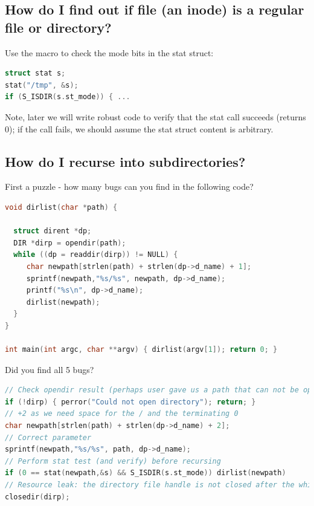 \subsection{How do I find out if file (an inode) is a regular file or directory?}\label{how-do-i-find-out-if-file-an-inode-is-a-regular-file-or-directory}

Use the  macro to check the mode bits in the stat struct:

\begin{lstlisting}[language=C]
struct stat s;
stat("/tmp", &s);
if (S_ISDIR(s.st_mode)) { ... 
\end{lstlisting}

Note, later we will write robust code to verify that the stat call succeeds (returns 0); if the  call fails, we should assume the stat struct content is arbitrary.

\subsection{How do I recurse into subdirectories?}\label{how-do-i-recurse-into-subdirectories}

First a puzzle - how many bugs can you find in the following code?

\begin{lstlisting}[language=C]
void dirlist(char *path) {
  
  struct dirent *dp;
  DIR *dirp = opendir(path);
  while ((dp = readdir(dirp)) != NULL) {
     char newpath[strlen(path) + strlen(dp->d_name) + 1];
     sprintf(newpath,"%s/%s", newpath, dp->d_name);
     printf("%s\n", dp->d_name);
     dirlist(newpath);
  }
}

int main(int argc, char **argv) { dirlist(argv[1]); return 0; }
\end{lstlisting}

Did you find all 5 bugs?

\begin{lstlisting}[language=C]
// Check opendir result (perhaps user gave us a path that can not be opened as a directory
if (!dirp) { perror("Could not open directory"); return; }
// +2 as we need space for the / and the terminating 0
char newpath[strlen(path) + strlen(dp->d_name) + 2]; 
// Correct parameter
sprintf(newpath,"%s/%s", path, dp->d_name); 
// Perform stat test (and verify) before recursing
if (0 == stat(newpath,&s) && S_ISDIR(s.st_mode)) dirlist(newpath)
// Resource leak: the directory file handle is not closed after the while loop
closedir(dirp);
\end{lstlisting}

